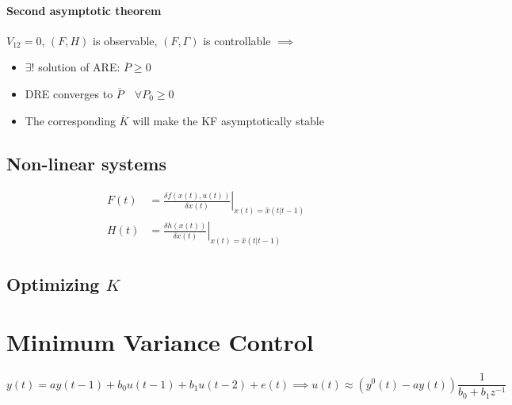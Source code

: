 \documentclass{report}
\begin{document}
\subsubsection{Second asymptotic theorem}
$V_{12}=0$, $(F,H)$ is observable, $(F,\Gamma)$ is controllable $\implies$
\begin{itemize}
\item $\exists!$ solution of ARE: $\overline{P}\geq 0$
\item DRE converges to $\overline{P}\quad\forall P_0\geq 0$
\item The corresponding $\overline{K}$ will make the KF asymptotically stable
\end{itemize}
\section{Non-linear systems}
\begin{align*}
F(t)&=\left.\frac{\delta f(x(t),u(t))}{\delta x(t)}\right\vert_{x(t)=\hat{x}(t|t-1)}\\
H(t)&=\left.\frac{\delta h(x(t))}{\delta x(t)}\right\vert_{x(t)=\hat{x}(t|t-1)}
\end{align*}
\section{Optimizing $K$}
\chapter{Minimum Variance Control}
\[
y(t)=ay(t-1)+b_0u(t-1)+b_1u(t-2)+e(t)
\implies
u(t)\approx \left(y^0(t)-ay(t)\right)\frac{1}{b_0+b_1z^{-1}}
\]
\end{document}
